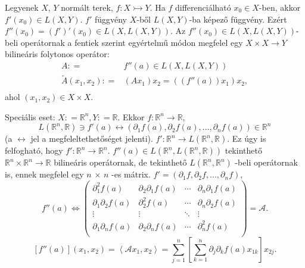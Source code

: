 \documentclass[12pt,a4paper]{scrartcl}
\begin{document}
Legyenek \(X\), \(Y\) normált terek,
\(\left. f:X\rightarrowtail Y \right.\). Ha \(f\) differenciálható
\(x_{0} \in X\)-ben, akkor
\(f'\left( x_{0} \right) \in L\left( {X,Y} \right)\). \(f'\) függvény
\(X\)-ből \(L\left( {X,Y} \right)\)-ba képező függvény. Ezért
\(f''\left( x_{0} \right) = \left( {f'} \right)'\left( x_{0} \right) \in L\left( {X,L\left( {X,Y} \right)} \right)\).
Az
\(f''\left( x_{0} \right) \in L\left( {X,L\left( {X,Y} \right)} \right)\)-beli
operátornak a fentiek szerint egyértelmű módon megfelel egy
\(\left. X \times X\rightarrow Y \right.\) bilineáris folytonos
operátor: \[\begin{aligned}
  A: =  & f''\left( a \right) \in L\left( {X,L\left( {X,Y} \right)} \right) \\ 
  \tilde A\left( {{x_1},{x_2}} \right): =  & \left( {A{x_1}} \right){x_2} = \left( {\left( {f''\left( a \right)} \right){x_1}} \right){x_2}, \\ 
\end{aligned} \] ahol \(\left( {x_{1},x_{2}} \right) \in X \times X\).

Speciális eset: \(X: = {\mathbb{R}}^{n},Y: = {\mathbb{R}}\). Ekkor
\(\left. f:{\mathbb{R}}^{n}\rightarrow{\mathbb{R}} \right.\),
\[\left. L\left( {{\mathbb{R}}^{n},{\mathbb{R}}} \right) \ni f'\left( a \right)\leftrightarrow\left( {\partial_{1}f\left( a \right),\partial_{2}f\left( a \right),...,\partial_{n}f\left( a \right)} \right) \in {\mathbb{R}}^{n} \right.\]
(a \(\leftrightarrow\) jel a megfeleltethetőséget jelenti).
\(\left. f':{\mathbb{R}}^{n}\rightarrow L\left( {{\mathbb{R}}^{n},{\mathbb{R}}} \right) \right.\).
Ez úgy is felfogható, hogy
\(\left. f':{\mathbb{R}}^{n}\rightarrow{\mathbb{R}}^{n} \right.\).
\(f''\left( a \right) \in L\left( {{\mathbb{R}}^{n},L\left( {{\mathbb{R}}^{n},{\mathbb{R}}} \right)} \right)\)
tekinthető
\(\left. {\mathbb{R}}^{n} \times {\mathbb{R}}^{n}\rightarrow{\mathbb{R}} \right.\)
bilineáris operátornak, de tekinthető
\(L\left( {{\mathbb{R}}^{n},{\mathbb{R}}^{n}} \right)\) -beli
operátornak is, ennek megfelel egy \(n\) × \(n\) -es mátrix.
\(f' = \left( {\partial_{1}f,\partial_{2}f,...,\partial_{n}f} \right)\),
\[\left. f''\left( a \right)\Leftrightarrow\left( \begin{array}{llll}
{\partial_{1}^{2}f\left( a \right)} & {\partial_{2}\partial_{1}f\left( a \right)} & \cdots & {\partial_{n}\partial_{1}f\left( a \right)} \\
{\partial_{1}\partial_{2}f\left( a \right)} & {\partial_{2}^{2}f\left( a \right)} & \cdots & {\partial_{n}\partial_{2}f\left( a \right)} \\
 \vdots & \vdots & \ddots & \vdots \\
{\partial_{1}\partial_{n}f\left( a \right)} & {\partial_{2}\partial_{n}f\left( a \right)} & \cdots & {\partial_{n}^{2}f\left( a \right)} \\
\end{array} \right) = \mathcal{A}. \right.\]
\[\left\lbrack {f''\left( a \right)} \right\rbrack\left( {x_{1},x_{2}} \right) = \left\langle {\mathcal{A}x_{1},x_{2}} \right\rangle = {\sum\limits_{j = 1}^{n}{\left\lbrack {\sum\limits_{k = 1}^{n}{\partial_{j}\partial_{k}f\left( a \right)x_{1k}}} \right\rbrack x_{2j}.}}\]
\end{document}
